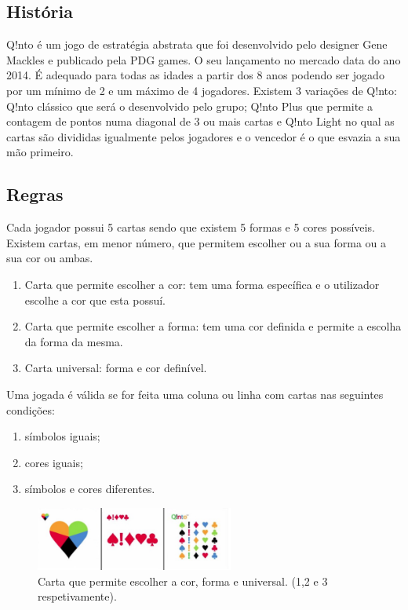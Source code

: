 \documentclass[a4paper]{article}
\begin{document}
\subsection{História}

Q!nto é um jogo de estratégia abstrata que foi desenvolvido pelo designer Gene Mackles e publicado pela PDG games. O seu lançamento no mercado data do ano 2014. É adequado para todas as idades a partir dos 8 anos podendo ser jogado por um mínimo de 2 e um máximo de 4 jogadores. Existem 3 variações de Q!nto: Q!nto clássico que será o desenvolvido pelo grupo; Q!nto Plus que permite a contagem de pontos numa diagonal de 3 ou mais cartas e Q!nto Light no qual as cartas são divididas igualmente pelos jogadores e o vencedor é o que esvazia a sua mão primeiro. 

\subsection{Regras}

Cada jogador possui 5 cartas sendo que existem 5 formas e 5 cores possíveis. Existem cartas, em menor número, que permitem escolher ou a sua forma ou a sua cor ou ambas.

\begin{enumerate}
	\item Carta que permite escolher a cor: tem uma forma específica e o utilizador escolhe a cor que esta possuí. 
	\item Carta que permite escolher a forma: tem uma cor definida e permite a escolha da forma da mesma.
	\item Carta universal: forma e cor definível. 
\end{enumerate}

\par
Uma jogada é válida se for feita uma coluna ou linha com cartas nas seguintes condições:

\begin{enumerate}
	\item símbolos iguais;
	\item cores iguais;
	\item símbolos e cores diferentes.
\end{enumerate}

\begin{figure}[ht!]
\centering
\includegraphics[width=65mm]{especiais.jpg}
\caption{Carta que permite escolher a cor, forma e universal. (1,2 e 3 respetivamente). \label{especiais}}
\end{figure}
\end{document}
